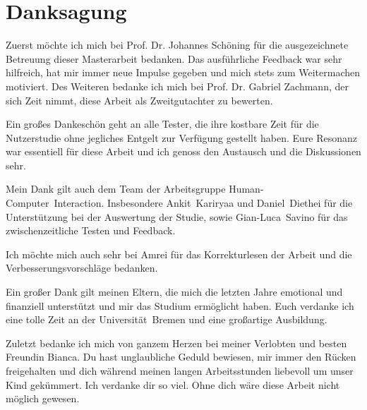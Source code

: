 \chapter*{Danksagung}
\thispagestyle{empty}

Zuerst möchte ich mich bei Prof. Dr. Johannes Schöning für die ausgezeichnete Betreuung dieser Masterarbeit bedanken.
Das ausführliche Feedback war sehr hilfreich, hat mir immer neue Impulse gegeben und mich stets zum Weitermachen motiviert.
Des Weiteren bedanke ich mich bei Prof. Dr. Gabriel Zachmann, der sich Zeit nimmt, diese Arbeit als Zweitgutachter zu bewerten.

\noindent
Ein großes Dankeschön geht an alle Tester, die ihre kostbare Zeit für die Nutzerstudie ohne jegliches Entgelt zur Verfügung gestellt haben.
Eure Resonanz war essentiell für diese Arbeit und ich genoss den Austausch und die Diskussionen sehr.

\noindent
Mein Dank gilt auch dem Team der Arbeitsgruppe Human-Computer~Interaction.
Insbesondere Ankit~Kariryaa und Daniel~Diethei für die Unterstützung bei der Auswertung der Studie, sowie Gian-Luca~Savino für das zwischenzeitliche Testen und Feedback.

\noindent
Ich möchte mich auch sehr bei Amrei für das Korrekturlesen der Arbeit und die Verbesserungsvorschläge bedanken.

\noindent
Ein großer Dank gilt meinen Eltern, die mich die letzten Jahre emotional und finanziell unterstützt und mir das Studium ermöglicht haben.
Euch verdanke ich eine tolle Zeit an der Universität~Bremen und eine großartige Ausbildung.

\noindent
Zuletzt bedanke ich mich von ganzem Herzen bei meiner Verlobten und besten Freundin Bianca.
Du hast unglaubliche Geduld bewiesen, mir immer den Rücken freigehalten und dich während meinen langen Arbeitsstunden liebevoll um unser Kind gekümmert.
Ich verdanke dir so viel. Ohne dich wäre diese Arbeit nicht möglich gewesen.

\cleardoublepage
